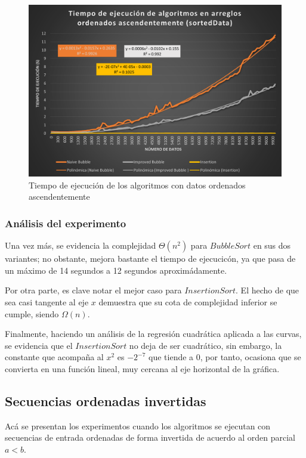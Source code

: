 \documentclass[letter]{article}
\begin{document}
\begin{figure}[h]
    \centering
    \includegraphics[scale=0.76]{sortedDataGraphic.png}
    \caption{Tiempo de ejecución de los algoritmos con datos ordenados ascendentemente}
   \label{experimentos:ordenadas:grafica}
\end{figure}

\subsubsection{Análisis del experimento}
\label{experimentos:ordenadas:analisis}
Una vez más, se evidencia la complejidad $\Theta(n^2)$ para $Bubble Sort$ en sus dos variantes; no obstante, mejora bastante el tiempo de ejecucicón, ya que pasa de un máximo de 14 segundos a 12 segundos aproximádamente.

Por otra parte, es clave notar el mejor caso para $Insertion Sort$. El hecho de que sea casi tangente al eje $x$ demuestra que su cota de complejidad inferior se cumple, siendo $\Omega(n)$.

Finalmente, haciendo un análisis de la regresión cuadrática aplicada a las curvas, se evidencia que el $Insertion Sort$ no deja de ser cuadrático, sin embargo, la constante que acompaña al $x^2$ es $-2^{-7}$ que tiende a 0, por tanto, ocasiona que se convierta en una función lineal, muy cercana al eje horizontal de la gráfica.


\subsection{Secuencias ordenadas invertidas} \label{experimentos:invertidas}

Acá se presentan los experimentos cuando los algoritmos se ejecutan con secuencias de entrada ordenadas de forma invertida de acuerdo al orden parcial $a<b$.
\end{document}
